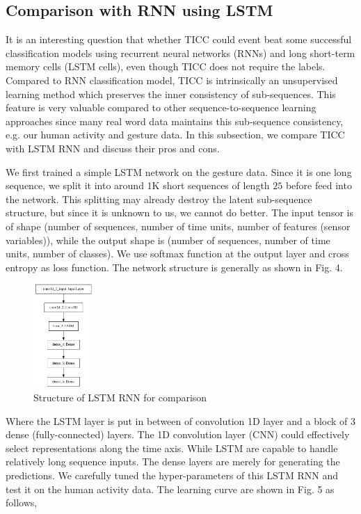 \documentclass{llncs}
\begin{document}
\subsection{Comparison with RNN using LSTM}
It is an interesting question that whether TICC could event beat some successful classification models using recurrent neural networks (RNNs) and long short-term memory cells (LSTM cells), even though TICC does not require the labels. Compared to RNN classification model, TICC is intrinsically an unsupervised learning method which preserves the inner consistency of sub-sequences. This feature is very valuable compared to other sequence-to-sequence learning approaches since many real word data maintains this sub-sequence consistency, e.g. our human activity and gesture data. In this subsection, we compare TICC with LSTM RNN and discuss their pros and cons.

We first trained a simple LSTM network on the gesture data. Since it is one long sequence, we split it into around 1K short sequences of length $25$ before feed into the network. This splitting may already destroy the latent sub-sequence structure, but since it is unknown to us, we cannot do better. The input tensor is of shape (number of sequences, number of time units, number of features (sensor variables)), while the output shape is (number of sequences, number of time units, number of classes). We use softmax function at the output layer and cross entropy as loss function. The network structure is generally as shown in Fig. 4.

\begin{figure}[H]
	\centering
	\includegraphics[width=0.2\textwidth]{NetworkStructure.png}
	\caption{Structure of LSTM RNN for comparison}
	\label{fig:network}
\end{figure}

Where the LSTM layer is put in between of convolution 1D layer and a block of 3 dense (fully-connected) layers. The 1D convolution layer (CNN) could effectively select representations along the time axis. While LSTM are capable to handle relatively long sequence inputs. The dense layers are merely for generating the predictions. We carefully tuned the hyper-parameters of this LSTM RNN and test it on the human activity data. The learning curve are shown in Fig. 5 as follows,
\end{document}
